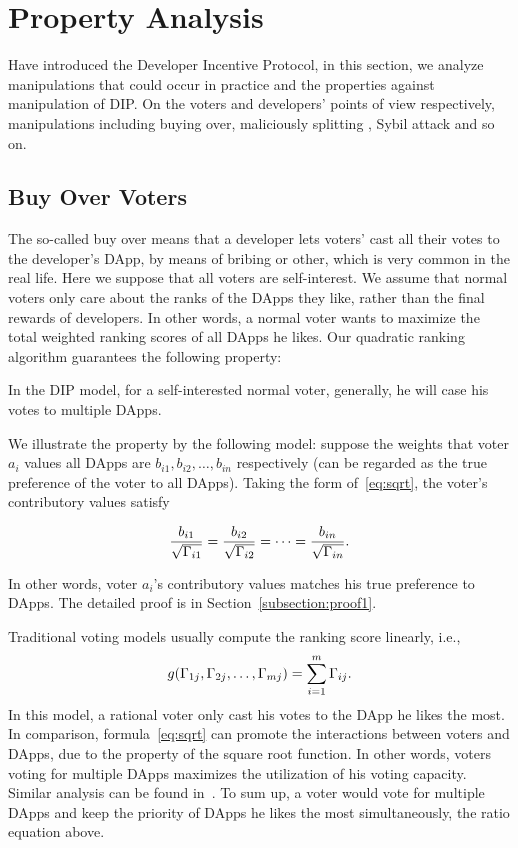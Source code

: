 \section{Property Analysis}
\label{section:properties}
\noindent Have introduced the Developer Incentive Protocol, in this section, we analyze
manipulations that could occur in practice and the properties against
manipulation of  DIP\@. On the voters and developers' points of view respectively, manipulations including buying over, maliciously splitting \dapp, Sybil attack and so on.
\subsection{Buy Over Voters}
\noindent The so-called buy over means that a developer lets voters' cast all their votes to the developer's DApp, by  means of bribing or other, which is very common in the real life. Here we suppose that all voters are self-interest. We assume that normal voters only care about the ranks of the DApps they like, rather than the final rewards of developers. In other words, a normal voter wants to maximize the total
weighted ranking scores of all DApps he likes. Our quadratic ranking algorithm guarantees the following property:

\begin{property}
	\label{p1}
	In the DIP model, for a self-interested normal voter, generally, he will case his votes to multiple DApps.
\end{property}
We illustrate the property by the following model: suppose the weights that
voter $a_i$ values all DApps are $b_{i1}, b_{i2}, \ldots, b_{in}$ respectively (can be regarded as the true preference of the voter to all DApps). Taking the form of~\ref{eq:sqrt}, the voter's contributory values satisfy

$$\frac{b_{i1}}{\sqrt{\Gamma_{i1}}}=\frac{b_{i2}}{\sqrt{\Gamma_{i2}}}=\cdots=\frac{b_{in}}{\sqrt{\Gamma_{in}}}.$$

In other words, voter $a_i$'s contributory values matches his true preference to DApps. The detailed proof is in Section~\ref{subsection:proof1}.

Traditional voting models usually compute the ranking score linearly, i.e.,
$$g(\Gamma_{1j},\Gamma_{2j},\ldots,\Gamma_{mj}) = \sum_{i=1}^m \Gamma_{ij}.$$
In this model, a rational voter only cast his votes to the DApp he likes the
most. In comparison, formula~\ref{eq:sqrt} can promote the interactions between
voters and DApps, due to the property of the square root function. In other
words, voters voting for multiple DApps maximizes the utilization of his voting
capacity. Similar analysis can be found in~\cite{buterin2018liberal}. To sum up,
a voter would vote for multiple DApps and keep the priority of DApps he likes
the most simultaneously, \ie the ratio equation above.

